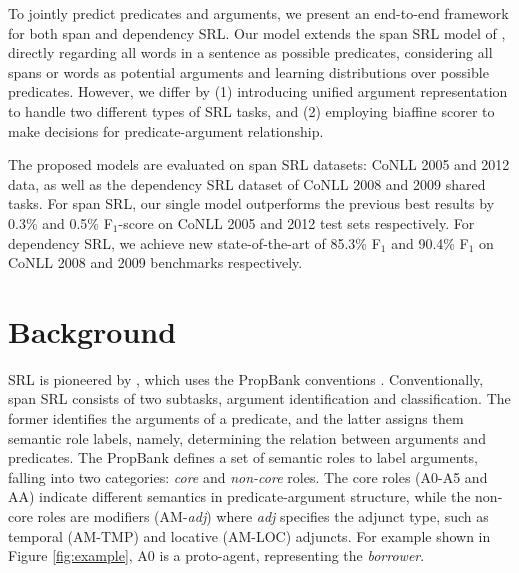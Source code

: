 \documentclass[letterpaper]{article} \usepackage{aaai19}  \usepackage{times}  \usepackage{helvet}  \usepackage{courier}  \usepackage{url}  \usepackage{graphicx}  \frenchspacing  \setlength{\pdfpagewidth}{8.5in}  \setlength{\pdfpageheight}{11in}
\begin{document}
To jointly predict predicates and arguments, we present an end-to-end framework for both span and dependency SRL. Our model extends the span SRL model of \citeauthor{he2018jointly} , directly regarding all words in a sentence as possible predicates, considering all spans or words as potential arguments and learning distributions over possible predicates. However, we differ by (1) introducing unified argument representation to handle two different types of SRL tasks, and (2) employing biaffine scorer to make decisions for predicate-argument relationship. 



The proposed models are evaluated on span SRL datasets: CoNLL 2005 and 2012 data, as well as the dependency SRL dataset of CoNLL 2008 and 2009 shared tasks. For span SRL, our single model outperforms the previous best results by 0.3\% and 0.5\% F$_1$-score on CoNLL 2005 and 2012 test sets respectively. For dependency SRL, we achieve new state-of-the-art of 85.3\% F$_1$ and 90.4\% F$_1$ on CoNLL 2008 and 2009 benchmarks respectively. 





\section{Background}

SRL is pioneered by \citeauthor{gildea2002} , which uses the PropBank conventions \cite{propbank}.
Conventionally, span SRL consists of two subtasks, argument identification and classification. The former identifies the arguments of a predicate, and the latter assigns them semantic role labels, namely, determining the relation between arguments and predicates. The PropBank defines a set of semantic roles to label arguments, falling into two categories: \textit{core} and \textit{non-core} roles. The core roles (A0-A5 and AA) indicate different semantics in predicate-argument structure, while the non-core roles are modifiers (AM-\textit{adj}) where \textit{adj} specifies the adjunct type, such as temporal (AM-TMP) and locative (AM-LOC) adjuncts. For example shown in Figure \ref{fig:example}, A0 is a proto-agent, representing the \textit{borrower}.
\end{document}
